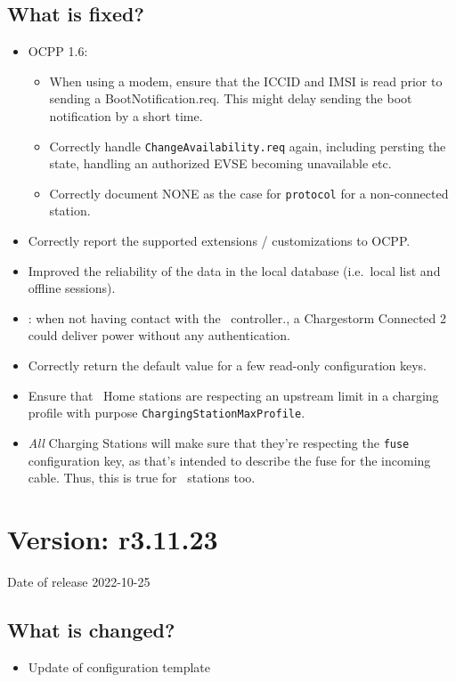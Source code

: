 \documentclass{scrartcl}
\begin{document}
\subsection*{What is fixed?}

\begin{itemize}
\item OCPP 1.6:
  \begin{itemize}
  \item When using a modem, ensure that the ICCID and IMSI is read prior to
    sending a BootNotification.req. This might delay sending the boot
    notification by a short time.
  \item Correctly handle \verb|ChangeAvailability.req| again, including
    persting the state, handling an authorized EVSE becoming unavailable etc.
  \item Correctly document NONE as the case for \verb|protocol| for a
    non-connected station.
  \end{itemize}
\item Correctly report the supported extensions / customizations to OCPP.
\item Improved the reliability of the data in the local database (i.e.\ local
  list and offline sessions).
\item \nanogrid: when not having contact with the \nanogrid\ controller., a
  Chargestorm Connected 2 could deliver power without any authentication.
\item Correctly return the default value for a few read-only configuration keys.
\item Ensure that \nanogrid\ Home stations are respecting an upstream limit in
  a charging profile with purpose \verb|ChargingStationMaxProfile|.
\item \emph{All} Charging Stations will make sure that they're respecting the
  \verb|fuse| configuration key, as that's intended to describe the fuse for
  the incoming cable. Thus, this is true for \nanogrid\ stations too.
\end{itemize}

\section{Version: r3.11.23}
Date of release 2022-10-25
\subsection*{What is changed?}
\begin{itemize}
\item Update of configuration template
\end{itemize}
\end{document}
